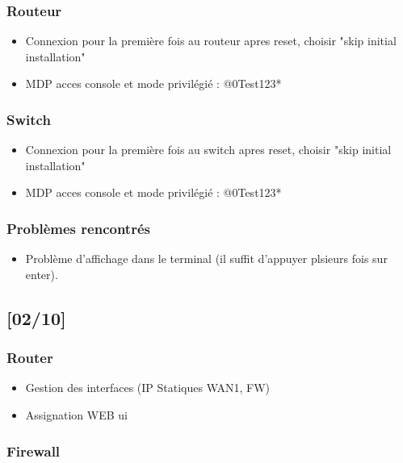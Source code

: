 \documentclass[a4paper,12pt]{article}
\begin{document}
\subsubsection{Routeur}

\begin{itemize}
\item Connexion pour la première fois au routeur apres reset, choisir "skip initial installation"
\item MDP acces console et mode privilégié : @0Test123*
\end{itemize}

\subsubsection{Switch}

\begin{itemize}
\item Connexion pour la première fois au switch apres reset, choisir "skip initial installation"
\item MDP acces console et mode privilégié : @0Test123*
\end{itemize}


\subsubsection{Problèmes rencontrés}
\begin{itemize}
\item Problème d'affichage dans le terminal (il suffit d'appuyer plsieurs fois sur enter).
\end{itemize} 


\newpage


\subsection{[02/10]}



\subsubsection{Router}

\begin{itemize}
\item Gestion des interfaces (IP Statiques WAN1, FW)
\item Assignation WEB ui
\end{itemize} 


\subsubsection{Firewall}
\end{document}
